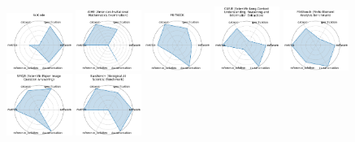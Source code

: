\begin{figure}[ht!]
\\[1ex]
\includegraphics[width=0.1900\textwidth]{images/scicode_radar.pdf}
\includegraphics[width=0.1900\textwidth]{images/aime_american_invitational_mathematics_examination_radar.pdf}
\includegraphics[width=0.1900\textwidth]{images/prmk_radar.pdf}
\includegraphics[width=0.1900\textwidth]{images/curie_scientific_long-context_understanding_reasoning_and_information_extraction_radar.pdf}
\includegraphics[width=0.1900\textwidth]{images/feabench_finite_element_analysis_benchmark_radar.pdf}
\\[1ex]
\includegraphics[width=0.1900\textwidth]{images/spiqa_scientific_paper_image_question_answering_radar.pdf}
\includegraphics[width=0.1900\textwidth]{images/baisbench_biological_ai_scientist_benchmark_radar.pdf}

\end{figure}
